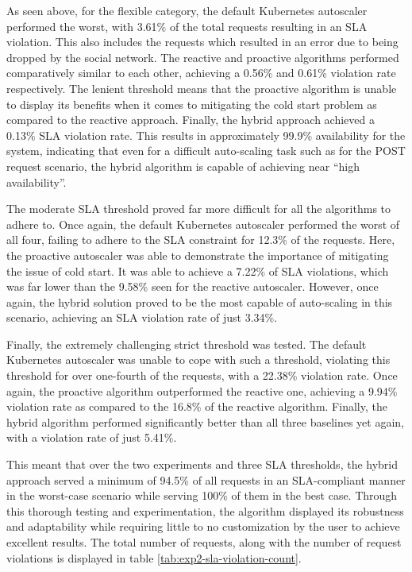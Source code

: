 As seen above, for the flexible category, the default Kubernetes autoscaler performed the worst, with 3.61\% of the total requests resulting in an SLA violation. This also includes the requests which resulted in an error due to being dropped by the social network. The reactive and proactive algorithms performed comparatively similar to each other, achieving a 0.56\% and 0.61\% violation rate respectively. The lenient threshold means that the proactive algorithm is unable to display its benefits when it comes to mitigating the cold start problem as compared to the reactive approach. Finally, the hybrid approach achieved a 0.13\% SLA violation rate. This results in approximately 99.9\% availability for the system, indicating that even for a difficult auto-scaling task such as for the POST request scenario, the hybrid algorithm is capable of achieving near ``high availability''.\par

The moderate SLA threshold proved far more difficult for all the algorithms to adhere to. Once again, the default Kubernetes autoscaler performed the worst of all four, failing to adhere to the SLA constraint for 12.3\% of the requests. Here, the proactive autoscaler was able to demonstrate the importance of mitigating the issue of cold start. It was able to achieve a 7.22\% of SLA violations, which was far lower than the 9.58\% seen for the reactive autoscaler. However, once again, the hybrid solution proved to be the most capable of auto-scaling in this scenario, achieving an SLA violation rate of just 3.34\%.

Finally, the extremely challenging strict threshold was tested. The default Kubernetes autoscaler was unable to cope with such a threshold, violating this threshold for over one-fourth of the requests, with a 22.38\% violation rate. Once again, the proactive algorithm outperformed the reactive one, achieving a 9.94\% violation rate as compared to the 16.8\% of the reactive algorithm. Finally, the hybrid algorithm performed significantly better than all three baselines yet again, with a violation rate of just 5.41\%.\par

This meant that over the two experiments and three SLA thresholds, the hybrid approach served a minimum of 94.5\% of all requests in an SLA-compliant manner in the worst-case scenario while serving 100\% of them in the best case. Through this thorough testing and experimentation, the algorithm displayed its robustness and adaptability while requiring little to no customization by the user to achieve excellent results. The total number of requests, along with the number of request violations is displayed in table \ref{tab:exp2-sla-violation-count}.\par

